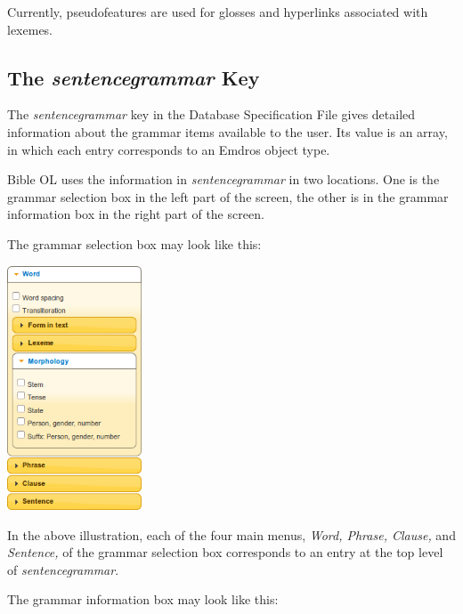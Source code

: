 \documentclass[11pt,oneside,a4paper]{memoir}
\begin{document}
Currently, pseudofeatures are used for glosses and hyperlinks associated with lexemes.

\subsection{The \emph{sentencegrammar} Key}\label{sentencegrammar}

The \emph{sentencegrammar} key in the Database Specification File gives detailed information about
the grammar items available to the user. Its value is an array, in which each entry
corresponds to an Emdros object type.

Bible OL uses the information in \emph{sentencegrammar} in two locations. One is the grammar
selection box in the left part of the screen, the other is in the
grammar information box in the right part of the screen.

The grammar selection box may look like this:

\begin{center}
  \includegraphics[width=0.3\textwidth]{grammarselect.png}\label{grammarselect}
\end{center}

In the above illustration, each of the four main menus, \emph{Word, Phrase, Clause,} and
\emph{Sentence,} of the grammar selection box corresponds to an entry at the top level of
\emph{sentencegrammar}.

The grammar information box may look like this:
\end{document}
